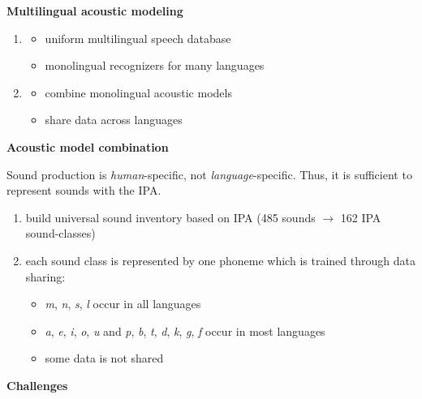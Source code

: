 \documentclass[11pt]{article}
\begin{document}
\vspace{10pt}
\textbf{Multilingual acoustic modeling}
\vspace{10pt}

\begin{enumerate}
    \item \begin{itemize}
            \item uniform multilingual speech database
            \item monolingual recognizers for many languages
        \end{itemize}
    \item \begin{itemize}
            \item combine monolingual acoustic models
            \item share data across languages
        \end{itemize}
\end{enumerate}

\vspace{10pt}
\textbf{Acoustic model combination}
\vspace{10pt}

Sound production is \textit{human}-specific, not \textit{language}-specific. Thus, it is sufficient to represent sounds with the IPA.
\begin{enumerate}
    \item build universal sound inventory based on IPA (485 sounds $\rightarrow$ 162 IPA sound-classes)
    \item each sound class is represented by one phoneme which is trained through data sharing:
        \begin{itemize}
            \item \textit{m}, \textit{n}, \textit{s}, \textit{l} occur in all languages
            \item \textit{a}, \textit{e}, \textit{i}, \textit{o}, \textit{u} and \textit{p}, \textit{b}, \textit{t}, \textit{d}, \textit{k}, \textit{g}, \textit{f} occur in most languages
            \item some data is not shared
        \end{itemize}
\end{enumerate}

\vspace{10pt}
\textbf{Challenges}
\vspace{5pt}
\end{document}
